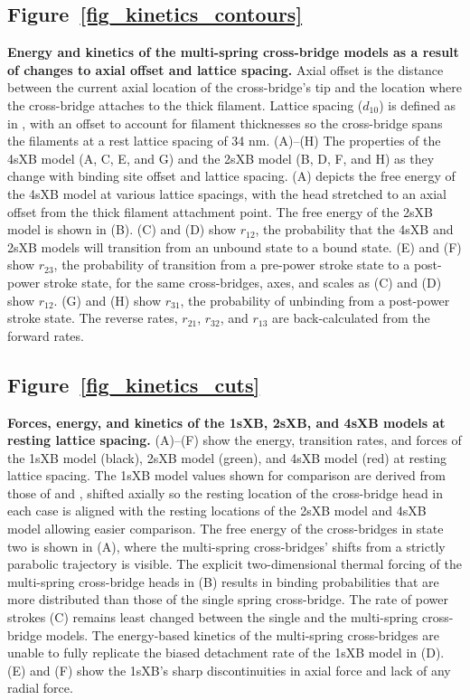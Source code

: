 \documentclass[11pt,titlepage]{article}
\begin{document}
\subsection*{Figure~\ref{fig_kinetics_contours}}
    \textbf{Energy and kinetics of the multi-spring cross-bridge models as a result of changes to axial offset and lattice spacing.} 
        Axial offset is the distance between the current axial location of the cross-bridge's tip and the location where the cross-bridge attaches to the thick filament.  
        Lattice spacing ($d_{10}$) is defined as in \protect\citet{Millman1998}, with an offset to account for filament thicknesses so the cross-bridge spans the filaments at a rest lattice spacing of 34 nm. 
        (A)--(H)  The properties of the 4sXB model (A, C, E, and G) and the 2sXB model (B, D, F, and H) as they change with binding site offset and lattice spacing.
        (A) depicts the free energy of the 4sXB model at various lattice spacings, with the head stretched to an axial offset from the thick filament attachment point.
        The free energy of the 2sXB model is shown in (B).  
        (C) and (D) show $r_{12}$, the probability that the 4sXB and 2sXB models will transition from an unbound state to a bound state. 
        (E) and (F) show $r_{23}$, the probability of transition from a pre-power stroke state to a post-power stroke state, for the same cross-bridges, axes, and scales as (C) and (D) show $r_{12}$.
        (G) and (H) show $r_{31}$, the probability of unbinding from a post-power stroke state. 
        The reverse rates, $r_{21}$, $r_{32}$, and $r_{13}$ are back-calculated from the forward rates.

\subsection*{Figure~\ref{fig_kinetics_cuts}}
        \textbf{Forces, energy, and kinetics of the 1sXB, 2sXB, and 4sXB models at resting lattice spacing.}
        (A)--(F) show the energy, transition rates, and forces of the 1sXB model (black), 2sXB model (green), and 4sXB model (red) at resting lattice spacing.  
        The 1sXB model values shown for comparison are derived from those of \protect\citet{Daniel1998} and \protect\citet{Tanner2007}, shifted axially so the resting location of the cross-bridge head in each case is aligned with the resting locations of the 2sXB model and 4sXB model allowing easier comparison. 
        The free energy of the cross-bridges in state two is shown in (A), where the multi-spring cross-bridges' shifts from a strictly parabolic trajectory is visible. 
        The explicit two-dimensional thermal forcing of the multi-spring cross-bridge heads in (B) results in binding probabilities that are more distributed than those of the single spring cross-bridge.
        The rate of power strokes (C) remains least changed between the single and the multi-spring cross-bridge models.  
        The energy-based kinetics of the multi-spring cross-bridges are unable to fully replicate the biased detachment rate of the 1sXB model in (D).
        (E) and (F) show the 1sXB's sharp discontinuities in axial force and lack of any radial force.
\end{document}
